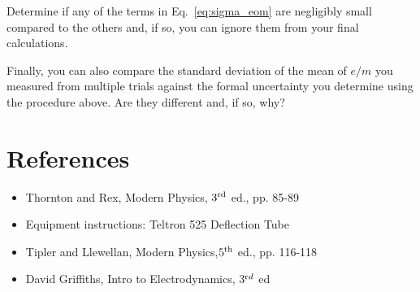 \documentclass{tufte-handout}
\begin{document}
Determine if any of the terms in Eq.~\ref{eq:sigma_eom} are negligibly small
compared to the others and, if so, you can ignore them from your final
calculations. 

Finally, you can also compare the standard deviation of the mean of $e/m$ you
measured from multiple trials against the formal uncertainty you determine using
the procedure above. Are they different and, if so, why?


\section{References}
\begin{itemize}
\item Thornton and Rex, Modern Physics, $3^{\rm rd}$ ed., pp. 85-89
\item Equipment instructions: Teltron 525 Deflection Tube
\item Tipler and Llewellan, Modern Physics,$5^{\rm th}$ ed., pp. 116-118
\item David Griffiths, Intro to Electrodynamics, 3$^{\textrm rd}$ ed
\end{itemize}
\end{document}
